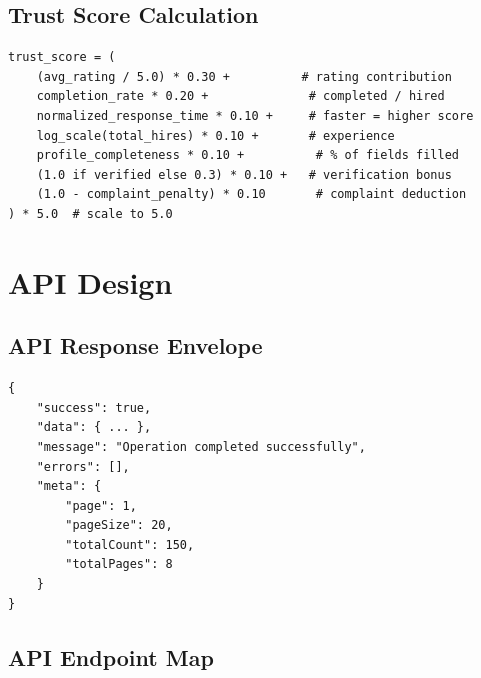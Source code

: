 \documentclass[12pt,a4paper,twoside]{report}
\begin{document}
\section{Trust Score Calculation}

\begin{verbatim}
trust_score = (
    (avg_rating / 5.0) * 0.30 +          # rating contribution
    completion_rate * 0.20 +              # completed / hired
    normalized_response_time * 0.10 +     # faster = higher score
    log_scale(total_hires) * 0.10 +       # experience
    profile_completeness * 0.10 +          # % of fields filled
    (1.0 if verified else 0.3) * 0.10 +   # verification bonus
    (1.0 - complaint_penalty) * 0.10       # complaint deduction
) * 5.0  # scale to 5.0
\end{verbatim}

\chapter{API Design}

\section{API Response Envelope}
\begin{lstlisting}[style=code, language=TeX, caption={Standard API Response (JSON)}]
{
    "success": true,
    "data": { ... },
    "message": "Operation completed successfully",
    "errors": [],
    "meta": {
        "page": 1,
        "pageSize": 20,
        "totalCount": 150,
        "totalPages": 8
    }
}
\end{lstlisting}

\section{API Endpoint Map}
\end{document}
